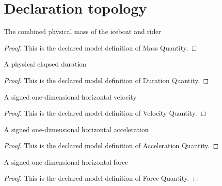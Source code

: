 \section{Declaration topology}
\begin{definition}
  \label{def:physics:phyx-mini-0801:phyxminiproblems-problemphyxmini0801-massquantity}
  The combined physical mass of the iceboat and rider
\end{definition}
\begin{proof}
  This is the declared model definition of Mass Quantity.
\end{proof}
\begin{definition}
  \label{def:physics:phyx-mini-0801:phyxminiproblems-problemphyxmini0801-durationquantity}
  A physical elapsed duration
\end{definition}
\begin{proof}
  This is the declared model definition of Duration Quantity.
\end{proof}
\begin{definition}
  \label{def:physics:phyx-mini-0801:phyxminiproblems-problemphyxmini0801-velocityquantity}
  A signed one-dimensional horizontal velocity
\end{definition}
\begin{proof}
  This is the declared model definition of Velocity Quantity.
\end{proof}
\begin{definition}
  \label{def:physics:phyx-mini-0801:phyxminiproblems-problemphyxmini0801-accelerationquantity}
  A signed one-dimensional horizontal acceleration
\end{definition}
\begin{proof}
  This is the declared model definition of Acceleration Quantity.
\end{proof}
\begin{definition}
  \label{def:physics:phyx-mini-0801:phyxminiproblems-problemphyxmini0801-forcequantity}
  A signed one-dimensional horizontal force
\end{definition}
\begin{proof}
  This is the declared model definition of Force Quantity.
\end{proof}
